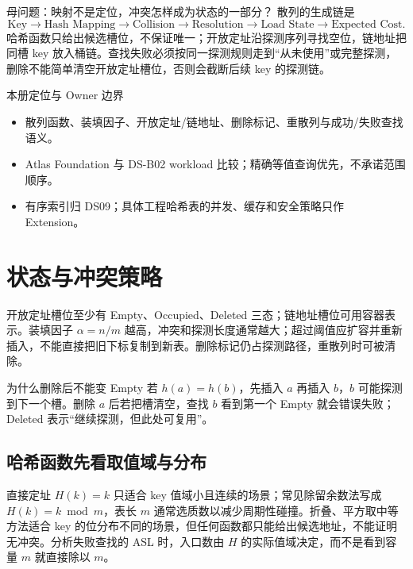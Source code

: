 \documentclass[UTF8,fontset=none,11pt,a4paper]{ctexart}
\begin{document}

\begin{corebox}{母问题：映射不是定位，冲突怎样成为状态的一部分？}
散列的生成链是
\[
\text{Key}\to\text{Hash Mapping}\to\text{Collision}\to\text{Resolution}\to\text{Load State}\to\text{Expected Cost}.
\]
哈希函数只给出候选槽位，不保证唯一；开放定址沿探测序列寻找空位，链地址把同槽 key 放入桶链。查找失败必须按同一探测规则走到“从未使用”或完整探测，删除不能简单清空开放定址槽位，否则会截断后续 key 的探测链。
\end{corebox}
\begin{methodbox}{本册定位与 Owner 边界}
\begin{itemize}
\item {}散列函数、装填因子、开放定址/链地址、删除标记、重散列与成功/失败查找语义。
\item {}Atlas Foundation 与 DS-B02 workload 比较；精确等值查询优先，不承诺范围顺序。
\item {}有序索引归 DS09；具体工程哈希表的并发、缓存和安全策略只作 Extension。
\end{itemize}
\end{methodbox}
\tableofcontents\newpage

\section{状态与冲突策略}
开放定址槽位至少有 Empty、Occupied、Deleted 三态；链地址槽位可用容器表示。装填因子 $\alpha=n/m$ 越高，冲突和探测长度通常越大；超过阈值应扩容并重新插入，不能直接把旧下标复制到新表。删除标记仍占探测路径，重散列时可被清除。
\begin{examplebox}{为什么删除后不能变 Empty}
若 $h(a)=h(b)$，先插入 $a$ 再插入 $b$，$b$ 可能探测到下一个槽。删除 $a$ 后若把槽清空，查找 $b$ 看到第一个 Empty 就会错误失败；Deleted 表示“继续探测，但此处可复用”。
\end{examplebox}

\subsection{哈希函数先看取值域与分布}
直接定址 $H(k)=k$ 只适合 key 值域小且连续的场景；常见除留余数法写成 $H(k)=k\bmod m$，表长 $m$ 通常选质数以减少周期性碰撞。折叠、平方取中等方法适合 key 的位分布不同的场景，但任何函数都只能给出候选地址，不能证明无冲突。分析失败查找的 ASL 时，入口数由 $H$ 的实际值域决定，而不是看到容量 $m$ 就直接除以 $m$。
\end{document}
